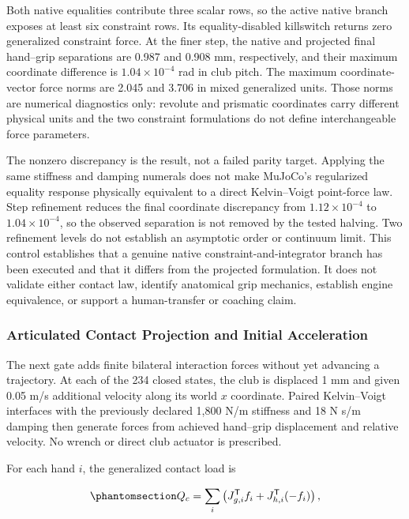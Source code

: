 \documentclass[
  letterpaper,
]{report}
\begin{document}
Both native equalities contribute three scalar rows, so the active
native branch exposes at least six constraint rows. Its
equality-disabled killswitch returns zero generalized constraint force.
At the finer step, the native and projected final hand--grip separations
are 0.987 and 0.908 mm, respectively, and their maximum coordinate
difference is \(1.04\times10^{-4}\) rad in club pitch. The maximum
coordinate-vector force norms are 2.045 and 3.706 in mixed generalized
units. Those norms are numerical diagnostics only: revolute and
prismatic coordinates carry different physical units and the two
constraint formulations do not define interchangeable force parameters.

The nonzero discrepancy is the result, not a failed parity target.
Applying the same stiffness and damping numerals does not make MuJoCo's
regularized equality response physically equivalent to a direct
Kelvin--Voigt point-force law. Step refinement reduces the final
coordinate discrepancy from \(1.12\times10^{-4}\) to
\(1.04\times10^{-4}\), so the observed separation is not removed by the
tested halving. Two refinement levels do not establish an asymptotic
order or continuum limit. This control establishes that a genuine native
constraint-and-integrator branch has been executed and that it differs
from the projected formulation. It does not validate either contact law,
identify anatomical grip mechanics, establish engine equivalence, or
support a human-transfer or coaching claim.

\subsubsection{Articulated Contact Projection and Initial
Acceleration}\label{articulated-contact-projection-and-initial-acceleration}

The next gate adds finite bilateral interaction forces without yet
advancing a trajectory. At each of the 234 closed states, the club is
displaced 1 mm and given 0.05 m/s additional velocity along its world
\(x\) coordinate. Paired Kelvin--Voigt interfaces with the previously
declared 1,800 N/m stiffness and 18 N s/m damping then generate forces
from achieved hand--grip displacement and relative velocity. No wrench
or direct club actuator is prescribed.

For each hand \(i\), the generalized contact load is

\begin{equation}\phantomsection\label{eq-articulated-contact-projection}{
Q_c = \sum_i\left(J_{g,i}^{\mathsf T}f_i
      + J_{h,i}^{\mathsf T}(-f_i)\right),
}\end{equation}
\end{document}
